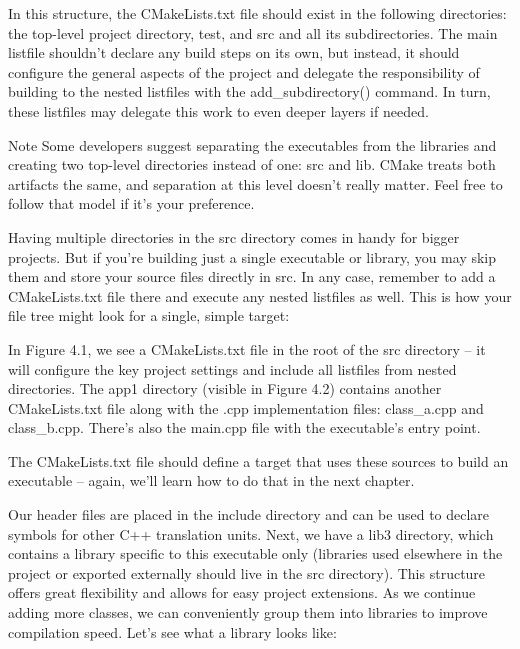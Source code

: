 In this structure, the CMakeLists.txt file should exist in the following directories: the top-level project directory, test, and src and all its subdirectories. The main listfile shouldn’t declare any build steps on its own, but instead, it should configure the general aspects of the project and delegate the responsibility of building to the nested listfiles with the add\_subdirectory() command. In turn, these listfiles may delegate this work to even deeper layers if needed.

\begin{myNotic}{Note}
Some developers suggest separating the executables from the libraries and creating two top-level directories instead of one: src and lib. CMake treats both artifacts the same, and separation at this level doesn’t really matter. Feel free to follow that model if it’s your preference.
\end{myNotic}

Having multiple directories in the src directory comes in handy for bigger projects. But if you’re building just a single executable or library, you may skip them and store your source files directly in src. In any case, remember to add a CMakeLists.txt file there and execute any nested listfiles as well. This is how your file tree might look for a single, simple target:


In Figure 4.1, we see a CMakeLists.txt file in the root of the src directory – it will configure the key project settings and include all listfiles from nested directories. The app1 directory (visible in Figure 4.2) contains another CMakeLists.txt file along with the .cpp implementation files: class\_a.cpp and class\_b.cpp. There’s also the main.cpp file with the executable’s entry point.

The CMakeLists.txt file should define a target that uses these sources to build an executable – again, we’ll learn how to do that in the next chapter.

Our header files are placed in the include directory and can be used to declare symbols for other C++ translation units.
Next, we have a lib3 directory, which contains a library specific to this executable only (libraries used elsewhere in the project or exported externally should live in the src directory). This structure offers great flexibility and allows for easy project extensions. As we continue adding more classes, we can conveniently group them into libraries to improve compilation speed. Let’s see what a library looks like:

